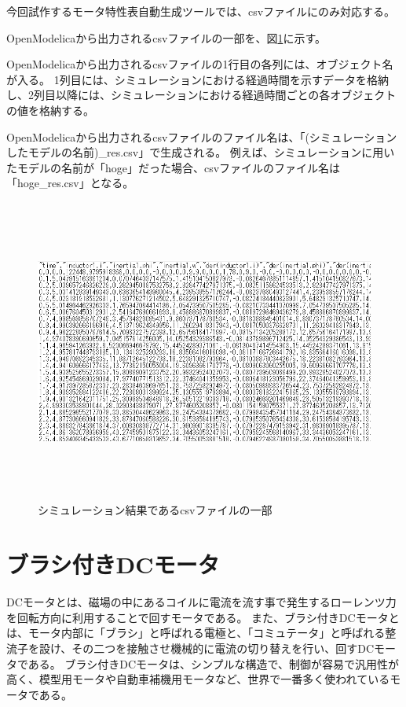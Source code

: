 今回試作するモータ特性表自動生成ツールでは、csvファイルにのみ対応する。

OpenModelicaから出力されるcsvファイルの一部を、図\ref{fig:simyu_csv}に示す。

OpenModelicaから出力されるcsvファイルの1行目の各列には、オブジェクト名が入る。
1列目には、シミュレーションにおける経過時間を示すデータを格納し、2列目以降には、シミュレーションにおける経過時間ごとの各オブジェクトの値を格納する。

OpenModelicaから出力されるcsvファイルのファイル名は、「(シミュレーションしたモデルの名前)\_res.csv」で生成される。
例えば、シミュレーションに用いたモデルの名前が「hoge」だった場合、csvファイルのファイル名は「hoge\_res.csv」となる。
\begin{figure}[t]
	\centering
	\includegraphics[width=16.5cm,height=10cm]{./Image/simyu_csv.png}
	\caption{シミュレーション結果であるcsvファイルの一部}
	\label{fig:simyu_csv}
\end{figure}
\section{ブラシ付きDCモータ}\label{bDCmotor}
DCモータとは、磁場の中にあるコイルに電流を流す事で発生するローレンツ力を回転方向に利用することで回すモータである\cite{モータ原理}。
また、ブラシ付きDCモータとは、モータ内部に「ブラシ」と呼ばれる電極と、「コミュテータ」と呼ばれる整流子を設け、その二つを接触させ機械的に電流の切り替えを行い、回すDCモータである。
ブラシ付きDCモータは、シンプルな構造で、制御が容易で汎用性が高く、模型用モータや自動車補機用モータなど、世界で一番多く使われているモータである\cite{モータ使う}。
